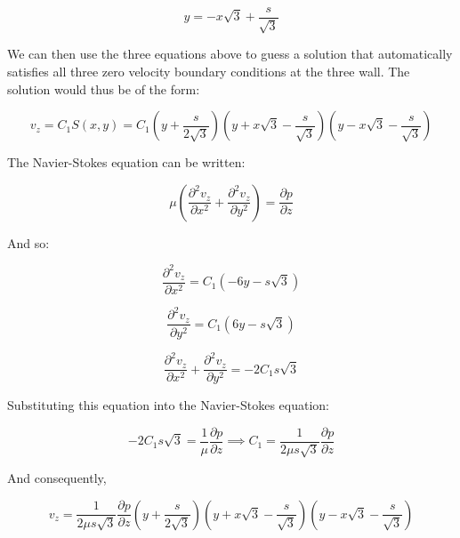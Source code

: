 \begin{equation}
y = -x\sqrt{3} + \frac{s}{\sqrt{3}}
\end{equation}

We can then use the three equations above to guess a solution that automatically satisfies all three zero velocity boundary conditions at the three wall. The solution would thus be of the form:

\begin{equation}
v_z = C_1 S(x,y) = C_1 \left( y + \frac{s}{2\sqrt{3}} \right) \left( y + x\sqrt{3} - \frac{s}{\sqrt{3}} \right) \left( y - x\sqrt{3} - \frac{s}{\sqrt{3}} \right)
\end{equation}

The Navier-Stokes equation can be written:

\begin{equation}
\mu \left( \frac{\partial^2 v_z}{\partial x^2} + \frac{\partial^2 v_z}{\partial y^2} \right) = \frac{\partial p}{\partial z}
\end{equation}

And so:

\begin{equation}
\frac{\partial^2 v_z}{\partial x^2} = C_1 (-6y - s\sqrt{3})
\end{equation}

\begin{equation}
\frac{\partial^2 v_z}{\partial y^2} = C_1 (6y - s\sqrt{3})
\end{equation}


\begin{equation}
\frac{\partial^2 v_z}{\partial x^2} + \frac{\partial^2 v_z}{\partial y^2} = - 2 C_1 s\sqrt{3}
\end{equation}

Substituting this equation into the Navier-Stokes equation:


\begin{equation}
- 2 C_1 s\sqrt{3} = \frac{1}{\mu}\frac{\partial p}{\partial z} \implies C_1 = \frac{1}{2\mu s\sqrt{3}}\frac{\partial p}{\partial z}
\end{equation}

And consequently,


\begin{equation}
v_z = \frac{1}{2\mu s\sqrt{3}}\frac{\partial p}{\partial z} \left( y + \frac{s}{2\sqrt{3}} \right) \left( y + x\sqrt{3} - \frac{s}{\sqrt{3}} \right) \left( y - x\sqrt{3} - \frac{s}{\sqrt{3}} \right)
\end{equation}

